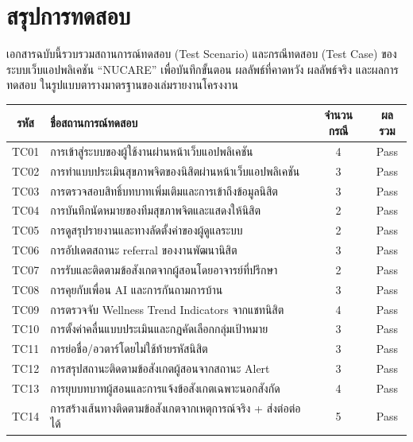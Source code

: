 \documentclass[11pt,a4paper]{article}
\begin{document}
\maketestcover

\section*{สรุปการทดสอบ}
เอกสารฉบับนี้รวบรวมสถานการณ์ทดสอบ (Test Scenario) และกรณีทดสอบ (Test Case)
ของระบบเว็บแอปพลิเคชัน ``NUCARE'' เพื่อบันทึกขั้นตอน ผลลัพธ์ที่คาดหวัง ผลลัพธ์จริง และผลการทดสอบ
ในรูปแบบตารางมาตรฐานของเล่มรายงานโครงงาน

\begin{center}
\begin{tabularx}{0.92\linewidth}{|c|Y|c|c|}
\hline
{}
\textbf{รหัส} & \textbf{ชื่อสถานการณ์ทดสอบ} & \textbf{จำนวนกรณี} & \textbf{ผลรวม} \\
\hline
TC01 & การเข้าสู่ระบบของผู้ใช้งานผ่านหน้าเว็บแอปพลิเคชัน & 4 & Pass \\
\hline
TC02 & การทำแบบประเมินสุขภาพจิตของนิสิตผ่านหน้าเว็บแอปพลิเคชัน & 3 & Pass \\
\hline
TC03 & การตรวจสอบสิทธิ์บทบาทเพิ่มเติมและการเข้าถึงข้อมูลนิสิต & 3 & Pass \\
\hline
TC04 & การบันทึกนัดหมายของทีมสุขภาพจิตและแสดงให้นิสิต & 2 & Pass \\
\hline
TC05 & การดูสรุปรายงานและทางลัดตั้งค่าของผู้ดูแลระบบ & 2 & Pass \\
\hline
TC06 & การอัปเดตสถานะ referral ของงานพัฒนานิสิต & 3 & Pass \\
\hline
TC07 & การรับและติดตามข้อสังเกตจากผู้สอนโดยอาจารย์ที่ปรึกษา & 2 & Pass \\
\hline
TC08 & การคุยกับเพื่อน AI และการกันถามการบ้าน & 3 & Pass \\
\hline
TC09 & การตรวจจับ Wellness Trend Indicators จากแชทนิสิต & 4 & Pass \\
\hline
TC10 & การตั้งค่าคลื่นแบบประเมินและกฎคัดเลือกกลุ่มเป้าหมาย & 3 & Pass \\
\hline
TC11 & การย่อชื่อ/อวตาร์โดยไม่ใช้ท้ายรหัสนิสิต & 3 & Pass \\
\hline
TC12 & การสรุปสถานะติดตามข้อสังเกตผู้สอนจากสถานะ Alert & 3 & Pass \\
\hline
TC13 & การยุบบทบาทผู้สอนและการแจ้งข้อสังเกตเฉพาะนอกสังกัด & 4 & Pass \\
\hline
TC14 & การสร้างเส้นทางติดตามข้อสังเกตจากเหตุการณ์จริง + ส่งต่อต่อได้ & 5 & Pass \\

\end{tabularx}
\end{center}
\end{document}
